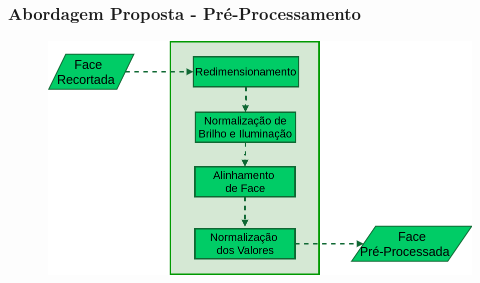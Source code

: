 \documentclass{beamer}
\begin{document}
\begin{frame}
\frametitle{Abordagem Proposta - Pré-Processamento}
\begin{figure}
\centering
\includegraphics[scale=0.34]{figuras/abordagem_5.png}
\label{fig:arquitetura3}
\end{figure}
\end{frame}
\end{document}
